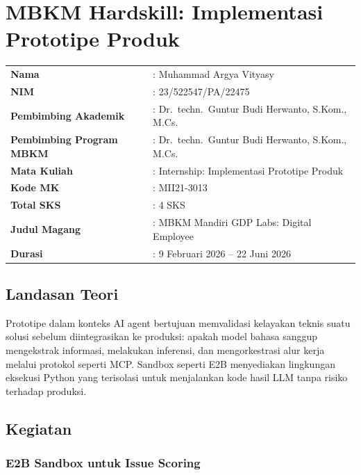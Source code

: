 \section{MBKM Hardskill: Implementasi Prototipe Produk}

\begin{table}[H]
    \centering
    \begin{tabular}{ll}
        \textbf{Nama} & : Muhammad Argya Vityasy \\
        \textbf{NIM} & : 23/522547/PA/22475 \\
        \textbf{Pembimbing Akademik} & : Dr.\ techn.\ Guntur Budi Herwanto, S.Kom., M.Cs. \\
        \textbf{Pembimbing Program MBKM} & : Dr.\ techn.\ Guntur Budi Herwanto, S.Kom., M.Cs. \\
        \textbf{Mata Kuliah} & : Internship: Implementasi Prototipe Produk \\
        \textbf{Kode MK} & : MII21-3013 \\
        \textbf{Total SKS} & : 4 SKS \\
        \textbf{Judul Magang} & : MBKM Mandiri GDP Labs: Digital Employee \\
        \textbf{Durasi} & : 9 Februari 2026 -- 22 Juni 2026 \\
    \end{tabular}
\end{table}

\subsection{Landasan Teori}

Prototipe dalam konteks AI agent bertujuan memvalidasi kelayakan teknis suatu solusi sebelum diintegrasikan ke produksi: apakah model bahasa sanggup mengekstrak informasi, melakukan inferensi, dan mengorkestrasi alur kerja melalui protokol seperti MCP. Sandbox seperti E2B menyediakan lingkungan eksekusi Python yang terisolasi untuk menjalankan kode hasil LLM tanpa risiko terhadap produksi.

\subsection{Kegiatan}

\subsubsection{E2B Sandbox untuk Issue Scoring}

